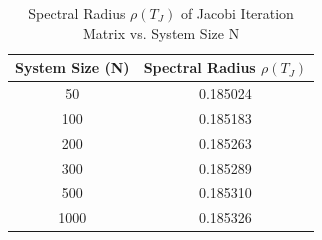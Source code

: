 \begin{table}[H]
\centering
\caption{Spectral Radius $\rho(T_J)$ of Jacobi Iteration Matrix vs. System Size N \label{tab:latex_table_spectral_radii}}
\begin{tabular}{cc}
\toprule
System Size (N) & Spectral Radius $\rho(T_J)$ \\
\midrule
50 & 0.185024 \\
100 & 0.185183 \\
200 & 0.185263 \\
300 & 0.185289 \\
500 & 0.185310 \\
1000 & 0.185326 \\
\bottomrule
\end{tabular}
\end{table}

